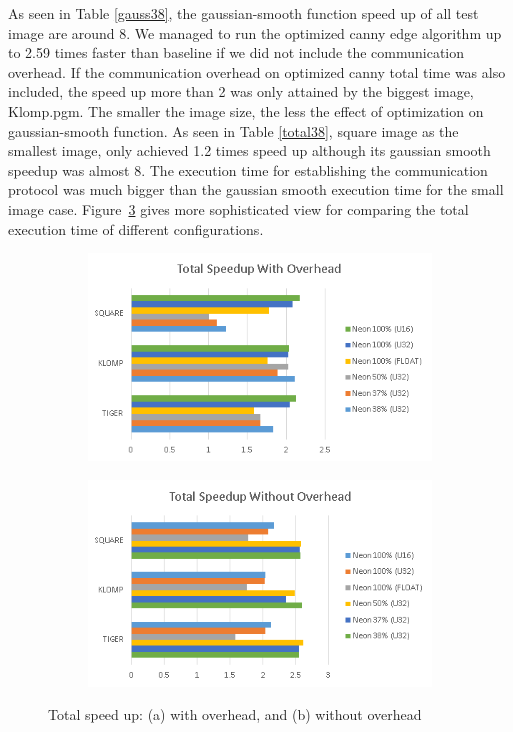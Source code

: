 \documentclass[conference]{IEEEtran}
\begin{document}
As seen in Table \ref{gauss38}, the gaussian-smooth function speed up of all test image are around 8. We managed to run the optimized canny edge algorithm up to 2.59 times faster than baseline if we did not include the communication overhead. If the communication overhead on optimized canny total time was also included, the speed up more than 2 was only attained by the biggest image, Klomp.pgm. The smaller the image size, the less the effect of optimization on gaussian-smooth function. As seen in Table \ref{total38}, square image as the smallest image, only achieved 1.2 times speed up although its gaussian smooth speedup was almost 8. The execution time for establishing the communication protocol was much bigger than the gaussian smooth execution time for the small image case. Figure~\ref{fig:speedupfig} gives more sophisticated view for comparing the total execution time of different configurations.

\begin{figure}[!ht]
\centering
\begin{subfigure}[b]{0.4\textwidth}
    \includegraphics[width=\textwidth]{pic/totalspeedupOv}
    \caption{}
    \label{fig:speedov}
\end{subfigure}
\begin{subfigure}[b]{0.4\textwidth}
    \includegraphics[width=\textwidth]{pic/totalspeedupwOv}
    \caption{}
    \label{fig:speedwov}
\end{subfigure}
   \caption{Total speed up: (a) with overhead, and (b) without overhead}
   \label{fig:speedupfig}
\end{figure} 
\end{document}

